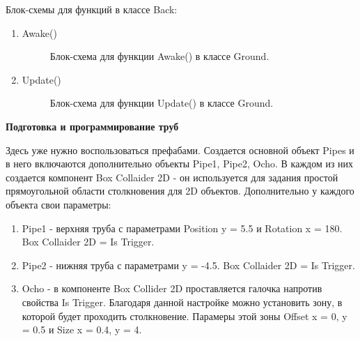 \documentclass[14pt, oneside]{altsu-report}
\begin{document}
Блок-схемы для функций в классе Back:
\begin{enumerate}
\item Awake() 

\begin{figure}[H]
\caption{Блок-схема для функции Awake() в классе Ground.}
\end{figure}

\item Update()
\begin{figure}[H]
\caption{Блок-схема для функции Update() в классе Ground.}
\end{figure}

\end{enumerate}

\textbf{Подготовка и программирование труб}

Здесь уже нужно воспользоваться префабами. Создается основной объект Pipes и в него включаются дополнительно объекты Pipe1, Pipe2, Ocho. В каждом из них создается компонент Box Collaider 2D - он используется для задания простой прямоугольной области столкновения для 2D объектов. Дополнительно у каждого объекта свои параметры: 

\begin{enumerate}
\item Pipe1 - верхняя труба с параметрами Position y = 5.5 и Rotation x = 180. Box Collaider 2D = Is Trigger.
\item Pipe2 - нижняя труба с параметрами  y = -4.5. Box Collaider 2D = Is Trigger.
\item Ocho - в компоненте Box Collider 2D проставляется галочка напротив свойства Is Trigger. Благодаря данной настройке можно установить зону, в которой будет проходить столкновение. Парамеры этой зоны Offset x = 0, y = 0.5 и Size x = 0.4, y = 4.
\end{enumerate} 
\end{document}
